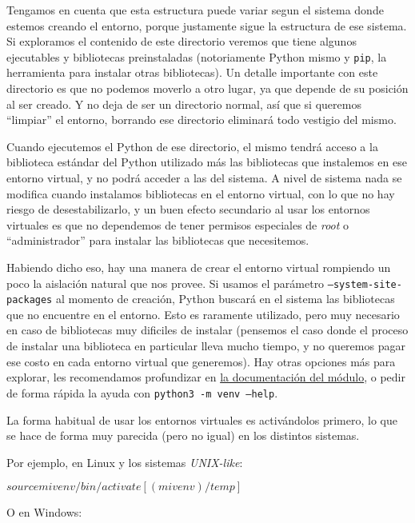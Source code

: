 Tengamos en cuenta que esta estructura puede variar segun el sistema donde estemos creando el entorno, porque justamente sigue la estructura de ese sistema. Si exploramos el contenido de este directorio veremos que tiene algunos ejecutables y bibliotecas preinstaladas (notoriamente Python mismo y \texttt{pip}, la herramienta para instalar otras bibliotecas). Un detalle importante con este directorio es que no podemos moverlo a otro lugar, ya que depende de su posición al ser creado. Y no deja de ser un directorio normal, así que si queremos ``limpiar'' el entorno, borrando ese directorio eliminará todo vestigio del mismo.

Cuando ejecutemos el Python de ese directorio, el mismo tendrá acceso a la biblioteca estándar del Python utilizado más las bibliotecas que instalemos en ese entorno virtual, y no podrá acceder a las del sistema. A nivel de sistema nada se modifica cuando instalamos bibliotecas en el entorno virtual, con lo que no hay riesgo de desestabilizarlo, y un buen efecto secundario al usar los entornos virtuales es que no dependemos de tener permisos especiales de \textit{root} o ``administrador'' para instalar las bibliotecas que necesitemos.

Habiendo dicho eso, hay una manera de crear el entorno virtual rompiendo un poco la aislación natural que nos provee. Si usamos el parámetro \texttt{--system-site-packages} al momento de creación, Python buscará en el sistema las bibliotecas que no encuentre en el entorno. Esto es raramente utilizado, pero muy necesario en caso de bibliotecas muy dificiles de instalar (pensemos el caso donde el proceso de instalar una biblioteca en particular lleva mucho tiempo, y no queremos pagar ese costo en cada entorno virtual que generemos). Hay otras opciones más para explorar, les recomendamos profundizar en \href{https://docs.python.org/es/dev/library/venv.html}{la documentación del módulo}, o pedir de forma rápida la ayuda con \texttt{python3 -m venv --help}.

La forma habitual de usar los entornos virtuales es activándolos primero, lo que se hace de forma muy parecida (pero no igual) en los distintos sistemas.

Por ejemplo, en Linux y los sistemas \textit{UNIX-like}:

\begin{shell}
[/temp]$ source mivenv/bin/activate
[(mivenv) /temp]$ 
\end{shell}

O en Windows:

